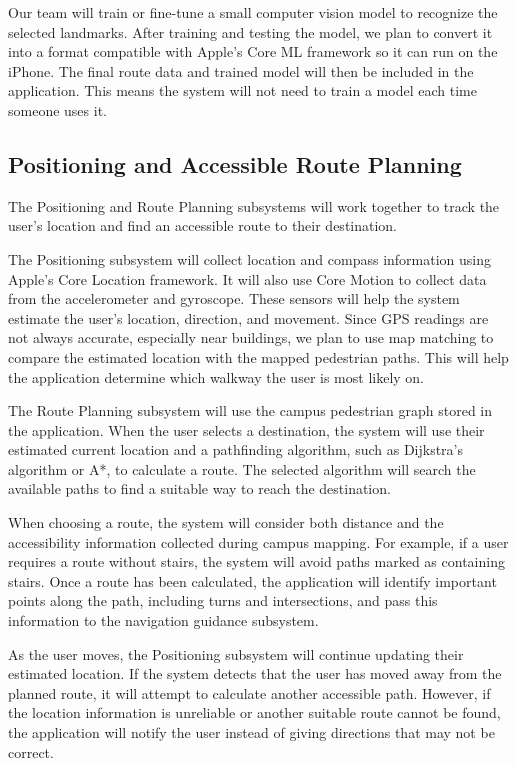 \documentclass[12pt,letterpaper,oneside,reqno]{book}
\theoremstyle{plain}
\theoremstyle{definition}
\theoremstyle{plain}
\theoremstyle{remark}
\theoremstyle{plain}
\theoremstyle{definition}
\theoremstyle{plain}
\begin{document}
Our team will train or fine-tune a small computer vision model to recognize the selected landmarks. After training and testing the model, we plan to convert it into a format compatible with Apple's Core ML framework so it can run on the iPhone. The final route data and trained model will then be included in the application. This means the system will not need to train a model each time someone uses it.

\subsection{Positioning and Accessible Route Planning}
The Positioning and Route Planning subsystems will work together to track the user's location and find an accessible route to their destination.

The Positioning subsystem will collect location and compass information using Apple's Core Location framework. It will also use Core Motion to collect data from the accelerometer and gyroscope. These sensors will help the system estimate the user's location, direction, and movement. Since GPS readings are not always accurate, especially near buildings, we plan to use map matching to compare the estimated location with the mapped pedestrian paths. This will help the application determine which walkway the user is most likely on.

The Route Planning subsystem will use the campus pedestrian graph stored in the application. When the user selects a destination, the system will use their estimated current location and a pathfinding algorithm, such as Dijkstra's algorithm or A*, to calculate a route. The selected algorithm will search the available paths to find a suitable way to reach the destination.

When choosing a route, the system will consider both distance and the accessibility information collected during campus mapping. For example, if a user requires a route without stairs, the system will avoid paths marked as containing stairs. Once a route has been calculated, the application will identify important points along the path, including turns and intersections, and pass this information to the navigation guidance subsystem.

As the user moves, the Positioning subsystem will continue updating their estimated location. If the system detects that the user has moved away from the planned route, it will attempt to calculate another accessible path. However, if the location information is unreliable or another suitable route cannot be found, the application will notify the user instead of giving directions that may not be correct.
\end{document}
